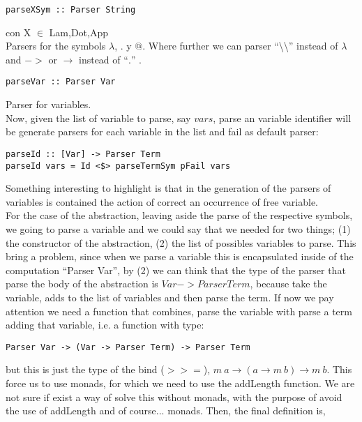 \documentclass[a4paper,10pt]{article}
\begin{document}
\begin{lstlisting}
parseXSym :: Parser String
\end{lstlisting} con X $\in$ {Lam,Dot,App}\\
Parsers for the symbols $\lambda$, $.$ y $@$. Where further we can
parser ``\textbackslash \textbackslash'' instead of $\lambda$ and $->$ or $\rightarrow$
instead of ``$.$'' .

\begin{lstlisting}
parseVar :: Parser Var
\end{lstlisting} Parser for variables.\\

Now, given the list of variable to parse, say $vars$, parse an variable identifier
will be generate parsers for each variable in the list and fail as default parser:

\begin{lstlisting}
parseId :: [Var] -> Parser Term
parseId vars = Id <$> parseTermSym pFail vars
\end{lstlisting}

Something interesting to highlight is that in the generation of the parsers of
variables is contained the action of correct an occurrence of free variable.\\

For the case of the abstraction, leaving aside the parse of the respective symbols,
we going to parse a variable and we could say that we needed for two things;
(1) the constructor of the abstraction, (2) the list of possibles variables to parse.
This bring a problem, since when we parse a variable this is encapsulated inside
of the computation ``Parser Var'', by (2) we can think that the type of the parser
that parse the body of the abstraction is $Var -> Parser Term$, because take the
variable, adds to the list of variables and then parse the term.
If now we pay attention we need a function that combines, parse the variable with
parse a term adding that variable, i.e. a function with type:

\begin{lstlisting}
Parser Var -> (Var -> Parser Term) -> Parser Term
\end{lstlisting}

but this is just the type of the bind ($>>=$), $m \ a \rightarrow (a \rightarrow m \ b) \rightarrow m \ b$. This force us to use monads, for which we need to use the addLength function. We are
not sure if exist a way of solve this without monads, with the purpose of avoid the
use of addLength and of course... monads. Then, the final definition is,
\end{document}
